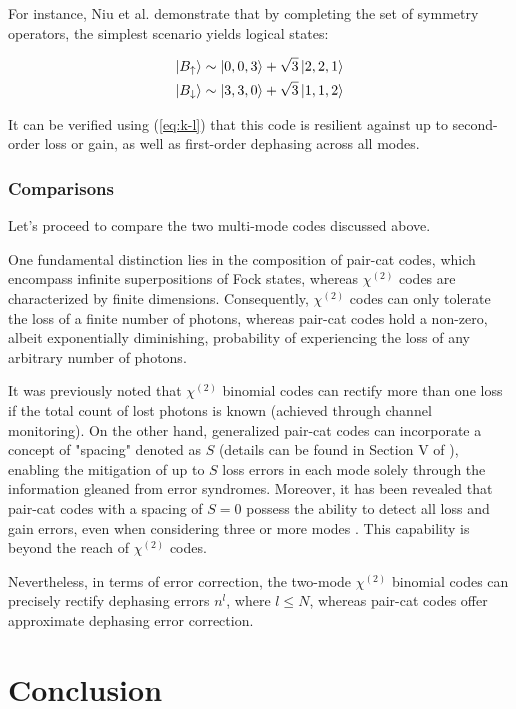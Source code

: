 \documentclass[11pt]{article}
\newcommand\0{\mathbf{0}}
\newcommand\<{\langle}
\renewcommand\>{\rangle}
\begin{document}
For instance, Niu et al. demonstrate that by completing the set of symmetry operators, the simplest scenario yields logical states:

\begin{align*}
	\ket{B_{\uparrow}} &\sim \ket{0, 0, 3} + \sqrt{3}\ket{2, 2, 1}\\
	\ket{B_{\downarrow}} &\sim \ket{3, 3, 0} + \sqrt{3}\ket{1, 1, 2}
\end{align*}

It can be verified using (\ref{eq:k-l}) that this code is resilient against up to second-order loss or gain, as well as first-order dephasing across all modes.

\subsubsection{Comparisons}

Let's proceed to compare the two multi-mode codes discussed above.

One fundamental distinction lies in the composition of pair-cat codes, which encompass infinite superpositions of Fock states, whereas $\chi^{(2)}$ codes are characterized by finite dimensions. Consequently, $\chi^{(2)}$ codes can only tolerate the loss of a finite number of photons, whereas pair-cat codes hold a non-zero, albeit exponentially diminishing, probability of experiencing the loss of any arbitrary number of photons.

It was previously noted that $\chi^{(2)}$ binomial codes can rectify more than one loss if the total count of lost photons is known (achieved through channel monitoring). On the other hand, generalized pair-cat codes can incorporate a concept of "spacing" denoted as $S$ (details can be found in Section V of \cite{albert2018multimode}), enabling the mitigation of up to $S$ loss errors in each mode solely through the information gleaned from error syndromes. Moreover, it has been revealed that pair-cat codes with a spacing of $S=0$ possess the ability to detect all loss and gain errors, even when considering three or more modes \cite{albert2018multimode}. This capability is beyond the reach of $\chi^{(2)}$ codes.

Nevertheless, in terms of error correction, the two-mode $\chi^{(2)}$ binomial codes can precisely rectify dephasing errors $n^l$, where $l \leq N$, whereas pair-cat codes offer approximate dephasing error correction.

\section{Conclusion}
\end{document}
